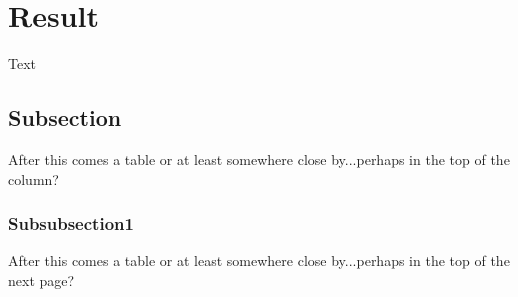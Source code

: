 \section{Result}\label{sec:result}
Text

\subsection{Subsection}
After this comes a table or at least somewhere close by...perhaps in the top
of the column?

\subsubsection{Subsubsection1}
After this comes a table or at least somewhere close by...perhaps in the top
of the next page?

